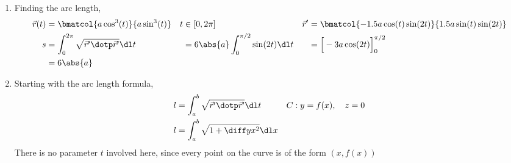 \begin{enumerate}
    \item Finding the arc length,
          \begin{align}
              \vec{r}(t) & = \bmatcol{a\cos^3(t)}{a\sin^3(t)}                     &
              t          & \in [0, 2\pi]                                          &
              \vec{r}'   & = \bmatcol{-1.5a\cos(t)\sin(2t)}{1.5a\sin(t)\sin(2t)}    \\
              s          & = \int_{0}^{2\pi} \sqrt{\vec{r}' \dotp \vec{r}'} \dl t &
                         & = 6\abs{a}\int_{0}^{\pi/2} \sin(2t) \dl t              &
                         & = \Big[ -3a\cos(2t) \Big]_0^{\pi/2}                      \\
                         & = 6\abs{a}
          \end{align}
          \begin{figure}[H]
              \centering
          \end{figure}

    \item Starting with the arc length formula,
          \begin{align}
              l & = \int_{a}^{b} \sqrt{\vec{r}' \dotp \vec{r}'} \dl t &
              C & : y = f(x), \quad z = 0                               \\
              l & = \int_{a}^{b} \sqrt{1 + \diff yx ^2} \dl x
          \end{align}
          There is no parameter $ t $ involved here, since every point on the curve is of
          the form $ (x, f(x)) $


\end{enumerate}
